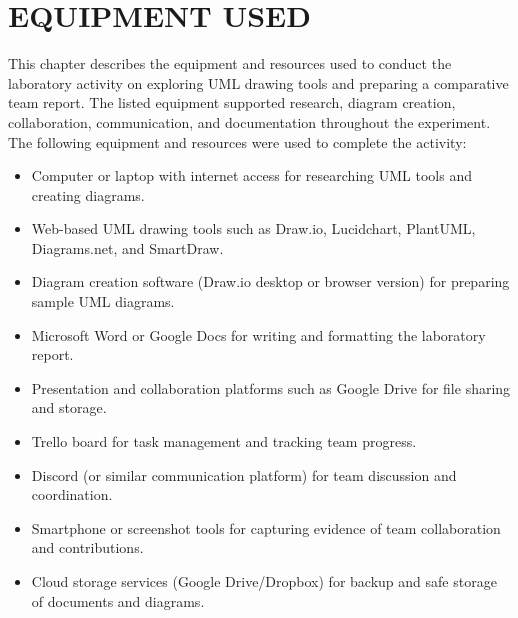 \chapter{EQUIPMENT USED}
\label{ch:eqp_used}
This chapter describes the equipment and resources used to conduct the laboratory activity on exploring UML drawing tools and preparing a comparative team report. The listed equipment supported research, diagram creation, collaboration, communication, and documentation throughout the experiment.\\

The following equipment and resources were used to complete the activity:

\begin{itemize}
  \item Computer or laptop with internet access for researching UML tools and creating diagrams.
  \item Web-based UML drawing tools such as Draw.io, Lucidchart, PlantUML, Diagrams.net, and SmartDraw.
  \item Diagram creation software (Draw.io desktop or browser version) for preparing sample UML diagrams.
  \item Microsoft Word or Google Docs for writing and formatting the laboratory report.
  \item Presentation and collaboration platforms such as Google Drive for file sharing and storage.
  \item Trello board for task management and tracking team progress.
  \item Discord (or similar communication platform) for team discussion and coordination.
  \item Smartphone or screenshot tools for capturing evidence of team collaboration and contributions.
  \item Cloud storage services (Google Drive/Dropbox) for backup and safe storage of documents and diagrams.
\end{itemize}
